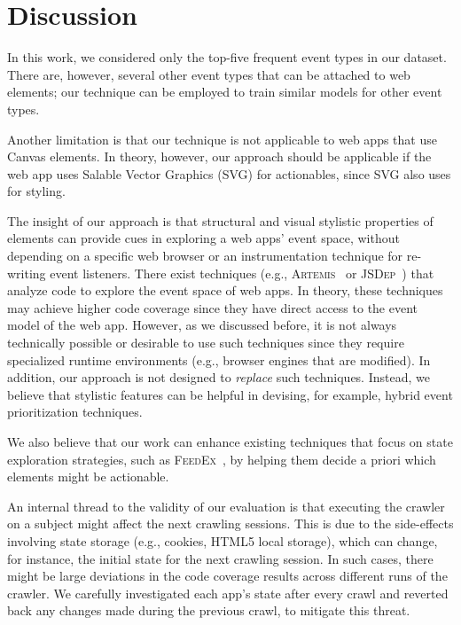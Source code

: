 
\section{Discussion}
\label{sec:discussion}

In this work, we considered only the top-five frequent event types in our dataset.
There are, however, several other event types that can be attached to web elements; our technique can be employed to 
train similar models for other event types.

Another limitation is that our technique is not applicable to web apps 
that use Canvas \html elements.
In theory, however,
our approach should be applicable if the web app uses Salable Vector Graphics (SVG)
for actionables,
since SVG also uses \css for styling.

The insight of our approach is that
structural and visual stylistic properties of 
elements can provide cues in exploring a web apps' event space, 
without depending on a specific web browser or an instrumentation technique 
for re-writing event listeners.
There exist techniques 
(e.g., \textsc{Artemis}~\cite{artzi2011framework} or \textsc{JSDep}~\cite{Sung:2016:StaticDomDependencyAnalysis})
that analyze \js code
to explore the event space of web apps.
In theory, these techniques may achieve higher \js code coverage
since they have direct access to the event model of the web app.
However, as we discussed before, it is not always technically possible
or desirable
to use such techniques since they require specialized runtime environments (e.g., browser engines that are modified).
In addition, our approach is not designed to \textit{replace}
such techniques.
Instead, we believe that stylistic features can be helpful in devising, 
for example, hybrid event prioritization techniques. 

We also believe that our work can enhance existing techniques
that focus on state exploration strategies, such as \textsc{FeedEx}~\cite{MilaniFard:2013:FeedEx}, by helping them decide a priori which elements might be actionable.  


An internal thread to the validity of our evaluation 
is that
executing the crawler on a subject might affect the next crawling sessions.
This is due to the side-effects involving state storage (e.g., cookies, HTML5 local storage),
which can change, for instance, the initial state for the next crawling session.
In such cases, there might be large deviations 
in the code coverage results across different runs of the crawler.
We carefully investigated each app's state after every crawl 
and reverted back any changes made during the previous crawl,
to mitigate this threat.

